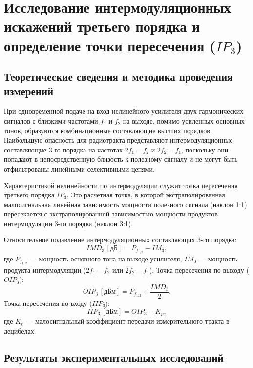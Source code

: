 \section{Исследование интермодуляционных искажений третьего порядка и определение точки пересечения ($IP_3$)}

\subsection{Теоретические сведения и методика проведения измерений}

При одновременной подаче на вход нелинейного усилителя двух гармонических сигналов с близкими частотами $f_1$ и $f_2$ на выходе, помимо усиленных основных тонов, образуются комбинационные составляющие высших порядков. Наибольшую опасность для радиотракта представляют интермодуляционные составляющие 3-го порядка на частотах $2f_1 - f_2$ и $2f_2 - f_1$, поскольку они попадают в непосредственную близость к полезному сигналу и не могут быть отфильтрованы линейными селективными цепями.

Характеристикой нелинейности по интермодуляции служит точка пересечения третьего порядка $IP_3$. Это расчетная точка, в которой экстраполированная малосигнальная линейная зависимость мощности полезного сигнала (наклон 1:1) пересекается с экстраполированной зависимостью мощности продуктов интермодуляции 3-го порядка (наклон 3:1).



 Относительное подавление интермодуляционных составляющих 3-го порядка:
    \begin{equation}
    IMD_3\,[\text{дБ}] = P_{f_{1,2}} - IM_3,
    \end{equation}
    где $P_{f_{1,2}}$ --- мощность основного тона на выходе усилителя, $IM_3$ --- мощность продукта интермодуляции ($2f_1 - f_2$ или $2f_2 - f_1$).
Точка пересечения по выходу ($OIP_3$):
    \begin{equation}
    OIP_3\,[\text{дБм}] = P_{f_{1,2}} + \frac{IMD_3}{2}.
    \end{equation}
Точка пересечения по входу ($IIP_3$):
    \begin{equation}
    IIP_3\,[\text{дБм}] = OIP_3 - K_p,
    \end{equation}
где $K_p$ --- малосигнальный коэффициент передачи измерительного тракта в децибелах.

\subsection{Результаты экспериментальных исследований}

